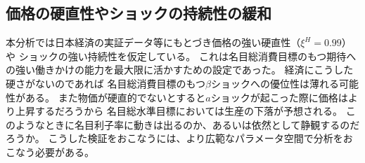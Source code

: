 \subsection{価格の硬直性やショックの持続性の緩和}
\label{sec:discussion_limitations_rigidity}
本分析では日本経済の実証データ等にもとづき価格の強い硬直性（\(\xi^H=0.99\)）や
ショックの強い持続性を仮定している。
これは名目総消費目標のもつ期待への強い働きかけの能力を最大限に活かすための設定であった。
経済にこうした硬さがないのであれば
名目総消費目標のもつ\(\beta\)ショックへの優位性は薄れる可能性がある。
また物価が硬直的でないとすると\(a\)ショックが起こった際に価格はより上昇するだろうから
名目総水準目標においては生産の下落が予想される。
このようなときに名目利子率に動きは出るのか、あるいは依然として静観するのだろうか。
こうした検証をおこなうには、より広範なパラメータ空間で分析をおこなう必要がある。